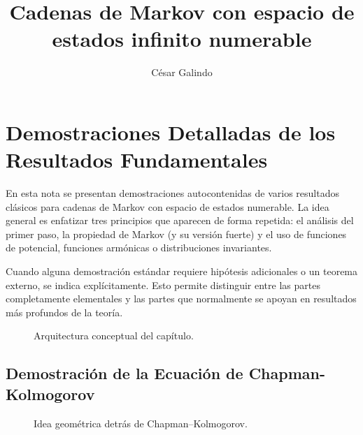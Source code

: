 \documentclass[11pt,a4paper]{article}
\title{Cadenas de Markov con espacio de estados infinito numerable}
\author{César Galindo}
\date{}
\theoremstyle{plain}
\theoremstyle{definition}
\theoremstyle{remark}
\newcommand{\1}{\mathds{1}}
\begin{document}
\maketitle

\section{Demostraciones Detalladas de los Resultados Fundamentales}

En esta nota se presentan demostraciones autocontenidas de varios resultados clásicos para cadenas de Markov con espacio de estados numerable. La idea general es enfatizar tres principios que aparecen de forma repetida: el análisis del primer paso, la propiedad de Markov (y su versión fuerte) y el uso de funciones de potencial, funciones armónicas o distribuciones invariantes.

Cuando alguna demostración estándar requiere hipótesis adicionales o un teorema externo, se indica explícitamente. Esto permite distinguir entre las partes completamente elementales y las partes que normalmente se apoyan en resultados más profundos de la teoría.

\begin{figure}[h!]
\centering
{}
\caption{Arquitectura conceptual del capítulo.}
\end{figure}


\subsection{Demostración de la Ecuación de Chapman-Kolmogorov}


\begin{figure}[h!]
\centering
{}
\caption{Idea geométrica detrás de Chapman--Kolmogorov.}
\end{figure}
\end{document}
